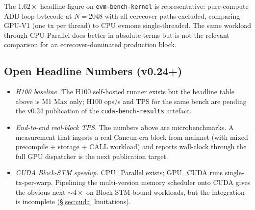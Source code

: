 The $1.62\times$ headline figure on \texttt{evm-bench-kernel} is
representative: pure-compute ADD-loop bytecode at $N{=}2048$ with all
ecrecover paths excluded, comparing GPU-V1 (one tx per thread) to CPU
evmone single-threaded. The same workload through CPU-Parallel does
better in absolute terms but is not the relevant comparison for an
ecrecover-dominated production block.

\subsection{Open Headline Numbers (v0.24+)}

\begin{itemize}
  \item \emph{H100 baseline.} The H100 self-hosted runner exists but the
    headline table above is M1 Max only; H100 ops/s and TPS for the same
    bench are pending the v0.24 publication of the
    \texttt{cuda-bench-results} artefact.
  \item \emph{End-to-end real-block TPS.} The numbers above are
    microbenchmarks. A measurement that ingests a real Cancun-era block
    from mainnet (with mixed precompile + storage + CALL workload) and
    reports wall-clock through the full GPU dispatcher is the next
    publication target.
  \item \emph{CUDA Block-STM speedup.} CPU\_Parallel exists; GPU\_CUDA
    runs single-tx-per-warp. Pipelining the multi-version memory
    scheduler onto CUDA gives the obvious next $\sim 4\times$ on
    Block-STM-bound workloads, but the integration is incomplete
    (\S\ref{sec:cuda} limitations).
\end{itemize}

